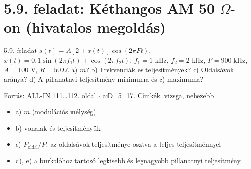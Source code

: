 \section{\texorpdfstring{5.9. feladat: Kéthangos AM 50 $\Omega$-on (hivatalos megoldás)}{5.9. feladat: Kéthangos AM 50 Ω-on (hivatalos megoldás)}}\label{ai5_09}
\setcounter{lepes}{0}
\begin{feladat}{5.9. feladat}
$s(t)=A[2+x(t)]\cos(2\pi Ft)$, $x(t)=0{,}1\sin(2\pi f_1t)+\cos(2\pi f_2t)$, $f_1=1$ kHz, $f_2=2$ kHz, $F=900$ kHz, $A=100$ V, $R=50\,\Omega$. a) $m$? b) Frekvenciák és teljesítmények? c) Oldalsávok aránya? d) A pillanatnyi teljesítmény minimuma és e) maximuma?

{\footnotesize\sffamily Forrás: ALL-IN 111\ldots{}112. oldal $\cdot$ aiD\_5\_17. Címkék: vizsga, nehezebb}
\end{feladat}
\begin{keresunk}
\begin{itemize}
\item a) $m$ (modulációs mélység)
\item b) vonalak és teljesítményük
\item c) $P_\text{oldal}/P$: az oldalsávok teljesítménye osztva a teljes teljesítménnyel
\item d), e) a burkolóhoz tartozó legkisebb és legnagyobb pillanatnyi teljesítmény
\end{itemize}
\end{keresunk}
